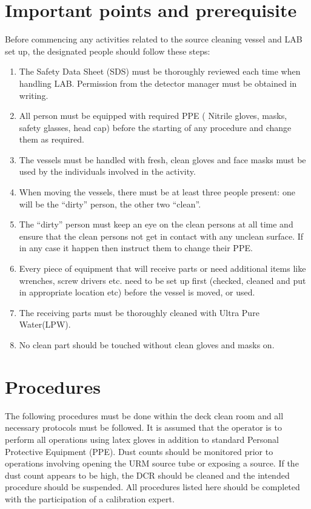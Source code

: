 \section{Important points and prerequisite}
Before commencing any activities related to the source cleaning vessel and LAB set up, the designated people should follow these steps:
\begin{enumerate}
\item The Safety Data Sheet (SDS) must be thoroughly reviewed each time when handling LAB. Permission from the detector manager must be obtained in writing.
\item All person must be equipped with required PPE ( Nitrile gloves, masks, safety glasses, head cap) before the starting of any procedure and change them as required.
\item The vessels must be handled with fresh, clean gloves and face masks must be used by the individuals involved in the activity.
\item  When moving the vessels, there must be at least three people present: one will be the “dirty” person, the other two “clean”.
\item The “dirty” person must keep an eye on the clean persons at all time and ensure that the clean persons not get in contact with any unclean surface.  If in any case it happen then instruct them to change their PPE.
\item Every piece of equipment that will receive parts or need additional items like wrenches, screw drivers etc. need to be set up first (checked, cleaned and put in appropriate location etc) before the vessel is moved, or used.
\item The receiving parts must be thoroughly cleaned with Ultra Pure Water(LPW). 
\item No clean part should be touched without clean gloves and masks on.

\end{enumerate}


\section{Procedures}
The following procedures must be done within the deck clean room and all necessary protocols must be followed. It is assumed that the operator is to perform all operations using latex gloves in addition to standard Personal Protective Equipment (PPE). Dust counts should be monitored prior to operations involving opening the  URM source tube or exposing a source. If the dust count appears to be high, the DCR should be cleaned and the intended procedure should be suspended. All procedures listed here should be completed with the participation of a calibration expert.

